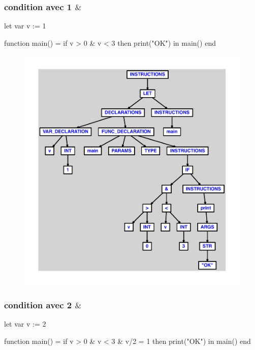 \documentclass{article}
\begin{document}
\subsubsection{condition avec 1 $ \& $}
\begin{verbatimtab}
let
	var v := 1

	function main() =
		if v > 0 & v < 3 then print("OK")
in main() end
\end{verbatimtab}
\begin{figure}[H]\centering\includegraphics[max width=\textwidth]{ast/ast_1.pdf}\end{figure}\subsubsection{condition avec 2 $ \& $}
\begin{verbatimtab}
let
	var v := 2

	function main() =
		if v > 0 & v < 3 & v/2 = 1 then print("OK")
in main() end
\end{verbatimtab}
\end{document}
